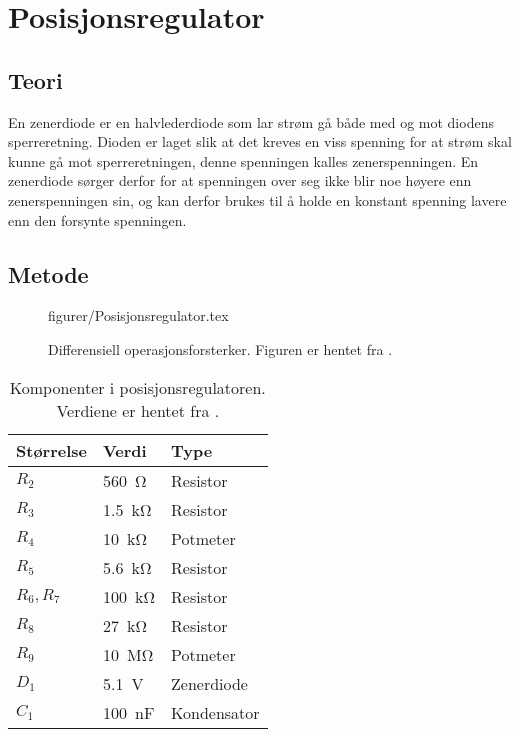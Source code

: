 \section{Posisjonsregulator}\label{sec:posisjonsregulator}

\subsection{Teori}


En zenerdiode er en halvlederdiode som lar strøm gå både med og mot diodens sperreretning. 
Dioden er laget slik at det kreves en viss spenning for at strøm skal kunne gå mot sperreretningen, denne spenningen kalles zenerspenningen.
En zenerdiode sørger derfor for at spenningen over seg ikke blir noe høyere enn zenerspenningen sin, og kan derfor brukes til å holde en konstant spenning lavere enn den forsynte spenningen\cite{Zenerdiode}.





\subsection{Metode}

\begin{figure} [h]
    \centering
     {figurer/Posisjonsregulator.tex}
    \caption{Differensiell operasjonsforsterker. Figuren er hentet fra \cite{AnalogMotorlabbOppgaver}.}
    \label{fig:Posisjonsregulator}
\end{figure}

\begin{table}[h]
    \centering
    \caption{Komponenter i posisjonsregulatoren. Verdiene er hentet fra \cite{AnalogMotorlabbOppgaver}.}
    \begin{tabular}{lll}
        \toprule
		Størrelse & Verdi & Type \\
		\midrule
        $R_2$ & \SI{560}{\ohm} & Resistor \\
        $R_3$ & \SI{1.5}{\kilo\ohm} & Resistor\\
        $R_4$ & \SI{10}{\kilo\ohm} & Potmeter\\
        $R_5$ & \SI{5.6}{\kilo\ohm} & Resistor\\
        $R_6, R_7$ & \SI{100}{\kilo\ohm} & Resistor\\
        $R_8$ & \SI{27}{\kilo\ohm} & Resistor\\
        $R_9$ & \SI{10}{\mega\ohm} & Potmeter\\
        $D_1$ & \SI{5.1}{\volt} & Zenerdiode\\
        $C_1$ & \SI{100}{\nano\farad} & Kondensator\\
		\bottomrule
    \end{tabular}
    \label{tab:Posisjonsregulator}
\end{table}

